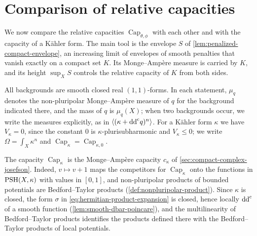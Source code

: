 \section{Comparison of relative capacities}
\label{sec:global-relative-capacity-comparison}
We now compare the relative capacities $\operatorname{Cap}_{\theta,\phi}$ with each other and with the capacity of a K\"ahler form. The main tool is the envelope $S$ of \cref{lem:penalized-compact-envelope}, an increasing limit of envelopes of smooth penalties that vanish exactly on a compact set $K$. Its Monge--Amp\`ere measure is carried by $K$, and its height $\sup_XS$ controls the relative capacity of $K$ from both sides.

All backgrounds are smooth closed real $(1,1)$-forms. In each statement, $\mu_q$ denotes the non-pluripolar Monge--Amp\`ere measure of $q$ for the background indicated there, and the mass of $q$ is $\mu_q(X)$; when two backgrounds occur, we write the measures explicitly, as in $\langle(\kappa+\mathrm{dd}^{\mathrm{c}} q)^n\rangle$. For a K\"ahler form $\kappa$ we have $V_\kappa=0$, since the constant $0$ is $\kappa$-plurisubharmonic and $V_\kappa\leq0$; we write $\Omega=\int_X\kappa^n$ and $\operatorname{Cap}_\kappa=\operatorname{Cap}_{\kappa,0}$.

The capacity $\operatorname{Cap}_\kappa$ is the Monge--Amp\`ere capacity $c_\kappa$ of \cref{sec:compact-complex-josefson}. Indeed, $v\mapsto v+1$ maps the competitors for $\operatorname{Cap}_\kappa$ onto the functions in $\mathrm{PSH}(X,\kappa)$ with values in $[0,1]$, and non-pluripolar products of bounded potentials are Bedford--Taylor products (\cref{def:nonpluripolar-product}). Since $\kappa$ is closed, the form $\sigma$ in \eqref{eq:hermitian-product-expansion} is closed, hence locally $\mathrm{dd}^{\mathrm{c}}$ of a smooth function (\cref{lem:smooth-dbar-poincare}), and the multilinearity of Bedford--Taylor products identifies the products defined there with the Bedford--Taylor products of local potentials.

